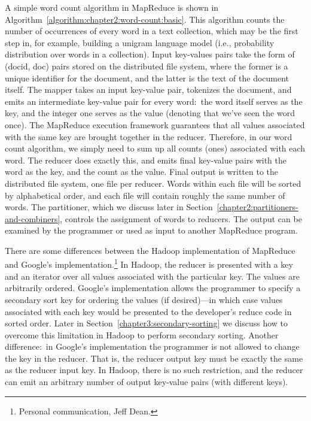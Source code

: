 A simple word count algorithm in MapReduce is shown in
Algorithm~\ref{algorithm:chapter2:word-count:basic}.  This algorithm counts the
number of occurrences of every word in a text collection, which may be
the first step in, for example, building a unigram language model
(i.e., probability distribution over words in a collection).  Input
key-values pairs take the form of (docid, doc) pairs stored on the
distributed file system, where the former is a unique identifier for
the document, and the latter is the text of the document itself.  The
mapper takes an input key-value pair, tokenizes the document, and
emits an intermediate key-value pair for every word:\ the word itself
serves as the key, and the integer one serves as the value (denoting
that we've seen the word once).  The MapReduce execution framework
guarantees that all values associated with the same key are brought
together in the reducer.  Therefore, in our word count algorithm, we
simply need to sum up all counts (ones) associated with each word.
The reducer does exactly this, and emits final key-value pairs with
the word as the key, and the count as the value.  Final output is
written to the distributed file system, one file per reducer.  Words
within each file will be sorted by alphabetical order, and each file
will contain roughly the same number of words.  The partitioner, which
we discuss later in Section~\ref{chapter2:partitioners-and-combiners},
controls the assignment of words to reducers.  The output can be
examined by the programmer or used as input to another MapReduce
program.

There are some differences between the Hadoop implementation of
MapReduce and Google's implementation.\footnote{Personal
communication, Jeff Dean.}  In Hadoop, the reducer is presented with a
key and an iterator over all values associated with the particular
key.  The values are arbitrarily ordered.  Google's implementation
allows the programmer to specify a secondary sort key for ordering the
values (if desired)---in which case values associated with each key
would be presented to the developer's reduce code in sorted order.
Later in Section~\ref{chapter3:secondary-sorting} we discuss how to
overcome this limitation in Hadoop to perform secondary sorting.
Another difference:\ in Google's implementation the programmer is not
allowed to change the key in the reducer.  That is, the reducer output
key must be exactly the same as the reducer input key.  In Hadoop,
there is no such restriction, and the reducer can emit an arbitrary
number of output key-value pairs (with different keys).

